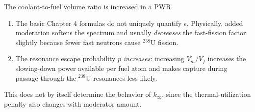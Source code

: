\newpage
{}

The coolant-to-fuel volume ratio is increased in a PWR.

\begin{adaptedsolution}
\begin{enumerate}
\item The basic Chapter 4 formulas do not uniquely quantify $\epsilon$.
Physically, added moderation softens the spectrum and usually \emph{decreases}
the fast-fission factor slightly because fewer fast neutrons cause
${}^{238}$U fission.
\item The resonance escape probability $p$ \emph{increases}: increasing
$V_m/V_f$ increases the slowing-down power available per fuel atom and makes
capture during passage through the ${}^{238}$U resonances less likely.
\end{enumerate}
This does not by itself determine the behavior of $k_\infty$, since the
thermal-utilization penalty also changes with moderator amount.
\end{adaptedsolution}
